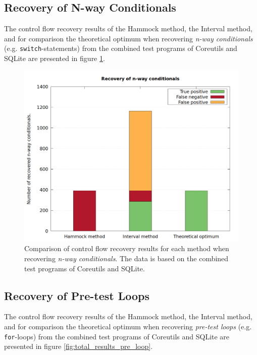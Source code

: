 \subsection{Recovery of N-way Conditionals}

The control flow recovery results of the Hammock method, the Interval method, and for comparison the theoretical optimum when recovering \textit{n-way conditionals} (e.g. \texttt{switch}-statements) from the combined test programs of Coreutils and SQLite are presented in figure \ref{fig:total_results_nway}.

\begin{figure}[htbp]
	\centering
	\includegraphics[width=\textwidth]{inc/5_results/results_n-way.png}
	\caption{Comparison of control flow recovery results for each method when recovering \textit{n-way conditionals}. The data is based on the combined test programs of Coreutils and SQLite.}
	\label{fig:total_results_nway}
\end{figure}

\clearpage

\subsection{Recovery of Pre-test Loops}

The control flow recovery results of the Hammock method, the Interval method, and for comparison the theoretical optimum when recovering \textit{pre-test loops} (e.g. \texttt{for}-loops) from the combined test programs of Coreutils and SQLite are presented in figure \ref{fig:total_results_pre_loop}.


